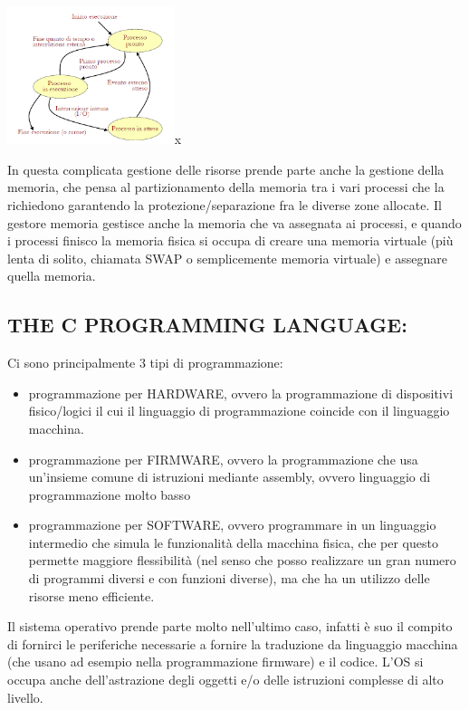 \documentclass[
  paper=a4,
  oneside  ,captions=tableheading
]{scrbook}
\providecommand{\tightlist}{%
  \setlength{\itemsep}{0pt}\setlength{\parskip}{0pt}}
\begin{document}
\includegraphics[height=4cm]{./image/image-20201123235406308.png}x

In questa complicata gestione delle risorse prende parte anche la
gestione della memoria, che pensa al partizionamento della memoria tra i
vari processi che la richiedono garantendo la protezione/separazione fra
le diverse zone allocate. Il gestore memoria gestisce anche la memoria
che va assegnata ai processi, e quando i processi finisco la memoria
fisica si occupa di creare una memoria virtuale (più lenta di solito,
chiamata SWAP o semplicemente memoria virtuale) e assegnare quella
memoria.

\hypertarget{the-c-programming-language}{%
\subsection{THE C PROGRAMMING
LANGUAGE:}\label{the-c-programming-language}}

Ci sono principalmente 3 tipi di programmazione:

\begin{itemize}
\tightlist
\item
  programmazione per HARDWARE, ovvero la programmazione di dispositivi
  fisico/logici il cui il linguaggio di programmazione coincide con il
  linguaggio macchina.
\item
  programmazione per FIRMWARE, ovvero la programmazione che usa
  un'insieme comune di istruzioni mediante assembly, ovvero linguaggio
  di programmazione molto basso
\item
  programmazione per SOFTWARE, ovvero programmare in un linguaggio
  intermedio che simula le funzionalità della macchina fisica, che per
  questo permette maggiore flessibilità (nel senso che posso realizzare
  un gran numero di programmi diversi e con funzioni diverse), ma che ha
  un utilizzo delle risorse meno efficiente.
\end{itemize}

Il sistema operativo prende parte molto nell'ultimo caso, infatti è suo
il compito di fornirci le periferiche necessarie a fornire la traduzione
da linguaggio macchina (che usano ad esempio nella programmazione
firmware) e il codice. L'OS si occupa anche dell'astrazione degli
oggetti e/o delle istruzioni complesse di alto livello.
\end{document}
